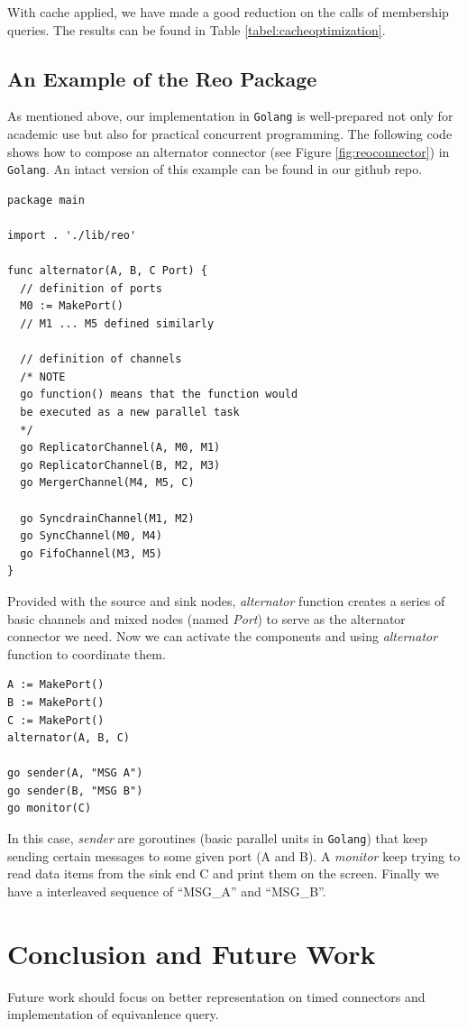 \documentclass[conference, a4paper]{IEEEtran}
\begin{document}
With cache applied, we have made a good reduction on the calls of membership queries. The results
can be found in Table \ref{tabel:cacheoptimization}.

\subsection{An Example of the Reo Package }
\label{sec:reolib}

As mentioned above, our implementation in \texttt{Golang} is well-prepared not only for academic use
but also for practical concurrent programming. The following code shows how to compose an alternator
connector (see Figure \ref{fig:reoconnector}) in \texttt{Golang}. An intact version of this example can be found in our github repo.

\begin{lstlisting}
package main

import . './lib/reo'

func alternator(A, B, C Port) {
  // definition of ports
  M0 := MakePort()
  // M1 ... M5 defined similarly

  // definition of channels
  /* NOTE
  go function() means that the function would
  be executed as a new parallel task
  */
  go ReplicatorChannel(A, M0, M1)
  go ReplicatorChannel(B, M2, M3)
  go MergerChannel(M4, M5, C)

  go SyncdrainChannel(M1, M2)
  go SyncChannel(M0, M4)
  go FifoChannel(M3, M5)
}
\end{lstlisting}

Provided with the source and sink nodes, \emph{alternator} function creates a series of basic
channels and mixed nodes (named \emph{Port}) to serve as the alternator connector we need. Now we
can activate the components and using \emph{alternator} function to coordinate them.

\begin{lstlisting}
A := MakePort()
B := MakePort()
C := MakePort()
alternator(A, B, C)

go sender(A, "MSG A")
go sender(B, "MSG B")
go monitor(C)
\end{lstlisting}

In this case, \emph{sender} are goroutines (basic parallel units in \texttt{Golang}) that keep
sending certain messages to some given port (A and B). A \emph{monitor} keep trying to read data
items from the sink end C and print them on the screen. Finally we have a interleaved sequence of
``MSG\_A'' and ``MSG\_B''.
 
\section{Conclusion and Future Work}
Future work should focus on better representation on timed connectors and implementation of
equivanlence query.




\listoftodos
\end{document}

